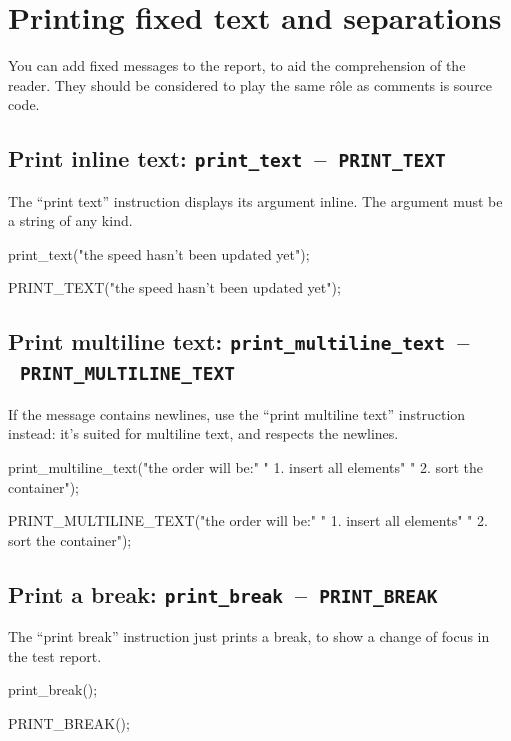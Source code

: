 \documentclass[twoside, a4paper, article]{memoir}
\newcommand*\testudocolor{\color{red!80!blue}}
\newcommand*\testudo[1]{\texttt{\testudocolor{}#1}}
\newcommand*\testudopair[2]{\testudo{#1}~--~\testudo{#2}}
\newcommand\subsectiontestudopair[3]{%
  \subsection[#1]{#1: \testudopair{#2}{#3}}}
\begin{document}
\section{Printing fixed text and separations}
\label{sec:printing-text-separations}

You can add fixed messages to the report, to aid the comprehension of the
reader.  They should be considered to play the same rôle as comments is source
code.

\subsectiontestudopair{Print inline text}{print\_text}{PRINT\_TEXT}
\label{sec:print-inline-text}

The ``print text'' instruction displays its argument inline.  The argument must
be a string of any kind.

\begin{cpplisting}
print_text("the speed hasn't been updated yet");
\end{cpplisting}

\begin{cpplisting}
PRINT_TEXT("the speed hasn't been updated yet");
\end{cpplisting}


\subsectiontestudopair{Print multiline text}%
  {print\_multiline\_text}{PRINT\_MULTILINE\_TEXT}
\label{sec:print-multiline-text}

If the message contains newlines, use the ``print multiline text'' instruction
instead: it's suited for multiline text, and respects the newlines.

\begin{cpplisting}
print_multiline_text("the order will be:\n"
                     "  1. insert all elements\n"
                     "  2. sort the container");
\end{cpplisting}

\begin{cpplisting}
PRINT_MULTILINE_TEXT("the order will be:\n"
                     "  1. insert all elements\n"
                     "  2. sort the container");
\end{cpplisting}

\subsectiontestudopair{Print a break}{print\_break}{PRINT\_BREAK}
\label{sec:print-break}

The ``print break'' instruction just prints a break, to show a change of focus
in the test report.

\begin{cpplisting}
print_break();
\end{cpplisting}

\begin{cpplisting}
PRINT_BREAK();
\end{cpplisting}
\end{document}
